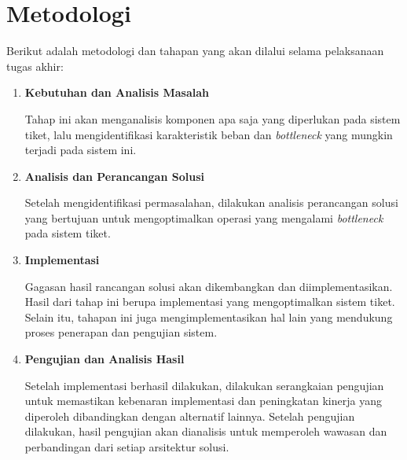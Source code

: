 \section{Metodologi}

Berikut adalah metodologi dan tahapan yang akan dilalui selama pelaksanaan tugas akhir:

\begin{enumerate}
      \item \textbf{Kebutuhan dan Analisis Masalah}

            Tahap ini akan menganalisis komponen apa saja yang diperlukan pada sistem tiket, lalu mengidentifikasi karakteristik beban dan \textit{bottleneck} yang mungkin terjadi pada sistem ini.

      \item \textbf{Analisis dan Perancangan Solusi}

            Setelah mengidentifikasi permasalahan, dilakukan analisis perancangan solusi yang bertujuan untuk mengoptimalkan operasi yang mengalami \textit{bottleneck} pada sistem tiket.

      \item \textbf{Implementasi}

            Gagasan hasil rancangan solusi akan dikembangkan dan diimplementasikan. Hasil dari tahap ini berupa implementasi yang mengoptimalkan sistem tiket. Selain itu, tahapan ini juga mengimplementasikan hal lain yang mendukung proses penerapan dan pengujian sistem.

      \item \textbf{Pengujian dan Analisis Hasil}

            Setelah implementasi berhasil dilakukan, dilakukan serangkaian pengujian untuk memastikan kebenaran implementasi dan peningkatan kinerja yang diperoleh dibandingkan dengan alternatif lainnya. Setelah pengujian dilakukan, hasil pengujian akan dianalisis untuk memperoleh wawasan dan perbandingan dari setiap arsitektur solusi.

\end{enumerate}